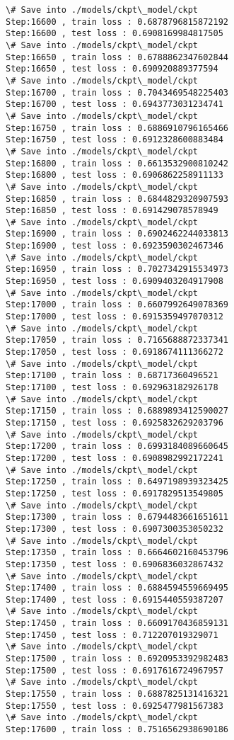 \documentclass[11pt]{article}
\begin{document}
\begin{Verbatim}[commandchars=\\\{\}]
\# Save into ./models/ckpt\_model/ckpt
Step:16600 , train loss : 0.6878796815872192
Step:16600 , test loss : 0.6908169984817505
\# Save into ./models/ckpt\_model/ckpt
Step:16650 , train loss : 0.6788862347602844
Step:16650 , test loss : 0.690920889377594
\# Save into ./models/ckpt\_model/ckpt
Step:16700 , train loss : 0.7043469548225403
Step:16700 , test loss : 0.6943773031234741
\# Save into ./models/ckpt\_model/ckpt
Step:16750 , train loss : 0.6886910796165466
Step:16750 , test loss : 0.6912328600883484
\# Save into ./models/ckpt\_model/ckpt
Step:16800 , train loss : 0.6613532900810242
Step:16800 , test loss : 0.6906862258911133
\# Save into ./models/ckpt\_model/ckpt
Step:16850 , train loss : 0.6844829320907593
Step:16850 , test loss : 0.691429078578949
\# Save into ./models/ckpt\_model/ckpt
Step:16900 , train loss : 0.6902462244033813
Step:16900 , test loss : 0.6923590302467346
\# Save into ./models/ckpt\_model/ckpt
Step:16950 , train loss : 0.7027342915534973
Step:16950 , test loss : 0.6909403204917908
\# Save into ./models/ckpt\_model/ckpt
Step:17000 , train loss : 0.6607992649078369
Step:17000 , test loss : 0.6915359497070312
\# Save into ./models/ckpt\_model/ckpt
Step:17050 , train loss : 0.7165688872337341
Step:17050 , test loss : 0.6918674111366272
\# Save into ./models/ckpt\_model/ckpt
Step:17100 , train loss : 0.68717360496521
Step:17100 , test loss : 0.692963182926178
\# Save into ./models/ckpt\_model/ckpt
Step:17150 , train loss : 0.6889893412590027
Step:17150 , test loss : 0.6925832629203796
\# Save into ./models/ckpt\_model/ckpt
Step:17200 , train loss : 0.6993184089660645
Step:17200 , test loss : 0.6908982992172241
\# Save into ./models/ckpt\_model/ckpt
Step:17250 , train loss : 0.6497198939323425
Step:17250 , test loss : 0.6917829513549805
\# Save into ./models/ckpt\_model/ckpt
Step:17300 , train loss : 0.6794483661651611
Step:17300 , test loss : 0.6907300353050232
\# Save into ./models/ckpt\_model/ckpt
Step:17350 , train loss : 0.6664602160453796
Step:17350 , test loss : 0.6906836032867432
\# Save into ./models/ckpt\_model/ckpt
Step:17400 , train loss : 0.6884594559669495
Step:17400 , test loss : 0.6915440559387207
\# Save into ./models/ckpt\_model/ckpt
Step:17450 , train loss : 0.6609170436859131
Step:17450 , test loss : 0.712207019329071
\# Save into ./models/ckpt\_model/ckpt
Step:17500 , train loss : 0.6920953392982483
Step:17500 , test loss : 0.6917616724967957
\# Save into ./models/ckpt\_model/ckpt
Step:17550 , train loss : 0.6887825131416321
Step:17550 , test loss : 0.6925477981567383
\# Save into ./models/ckpt\_model/ckpt
Step:17600 , train loss : 0.7516562938690186

\end{Verbatim}
\end{document}
